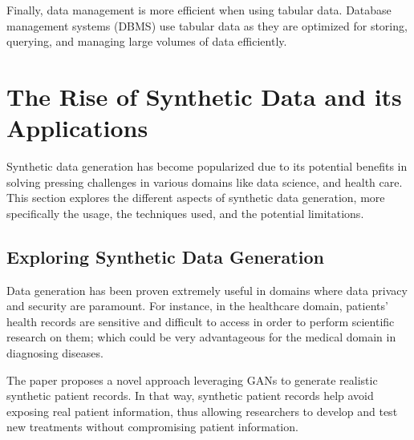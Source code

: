 \vspace{0.5cm}
Finally, data management is more efficient when using tabular data. Database management systems (DBMS) use tabular data as they are optimized for storing, querying, and managing large volumes of data efficiently. 










\section{The Rise of Synthetic Data and its Applications}


Synthetic data generation has become popularized due to its potential benefits in solving pressing challenges in various domains like data science, and health care. This section explores the different aspects of synthetic data generation, more specifically the usage, the techniques used, and the potential limitations.

\subsection{Exploring Synthetic Data Generation}

Data generation has been proven extremely useful in domains where data privacy and security are paramount. For instance, in the healthcare domain, patients' health records are sensitive and difficult to access in order to perform scientific research on them; which could be very advantageous for the medical domain in diagnosing diseases. 


\vspace{0.5cm}
The paper \cite{Choi2017} proposes a novel approach leveraging GANs to generate realistic synthetic patient records. In that way, synthetic patient records help avoid exposing real patient information, thus allowing researchers to develop and test new treatments without compromising patient information. 


